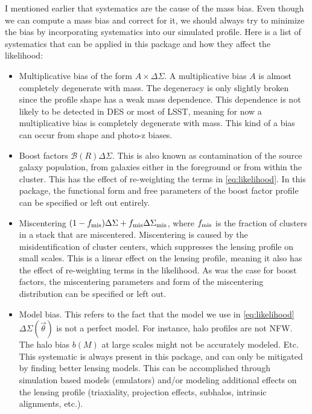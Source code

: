 \documentclass[12pt]{article}
\newcommand{\ds}{\Delta\Sigma}
\newcommand{\model}{\vec{\theta}}
\begin{document}
I mentioned earlier that systematics are the cause of the mass bias. Even though we can compute a mass bias and correct for it, we should always try to minimize the bias by incorporating systematics into our simulated profile. Here is a list of systematics that can be applied in this package and how they affect the likelihood:
%
\begin{itemize}
\item Multiplicative bias of the form $A\times\ds$. A multiplicative bias $A$ is almost completely degenerate with mass. The degeneracy is only slightly broken since the profile shape has a weak mass dependence. This dependence is not likely to be detected in DES or most of LSST, meaning for now a multiplicative bias is completely degenerate with mass. This kind of a bias can occur from shape and photo-z biases.
\item Boost factors $\mathcal{B}(R)\ds$. This is also known as contamination of the source galaxy population, from galaxies either in the foreground or from within the cluster. This has the effect of re-weighting the terms in \autoref{eq:likelihood}. In this package, the functional form and free parameters of the boost factor profile can be specified or left out entirely.
\item Miscentering $(1-f_{\rm mis})\ds + f_{\rm mis}\ds_{\rm mis}$, where $f_{\rm mis}$ is the fraction of clusters in a stack that are miscentered. Miscentering is caused by the misidentification of cluster centers, which suppresses the lensing profile on small scales. This is a linear effect on the lensing profile, meaning it also has the effect of re-weighting terms in the likelihood. As was the case for boost factors, the miscentering parameters and form of the miscentering distribution can be specified or left out.
\item Model bias. This refers to the fact that the model we use in \autoref{eq:likelihood} $\ds(\model)$ is not a perfect model. For instance, halo profiles are not NFW. The halo bias $b(M)$ at large scales might not be accurately modeled. Etc. This systematic is always present in this package, and can only be mitigated by finding better lensing models. This can be accomplished through simulation based models (emulators) and/or modeling additional effects on the lensing profile (triaxiality, projection effects, subhalos, intrinsic alignments, etc.).

\end{itemize}
\end{document}
